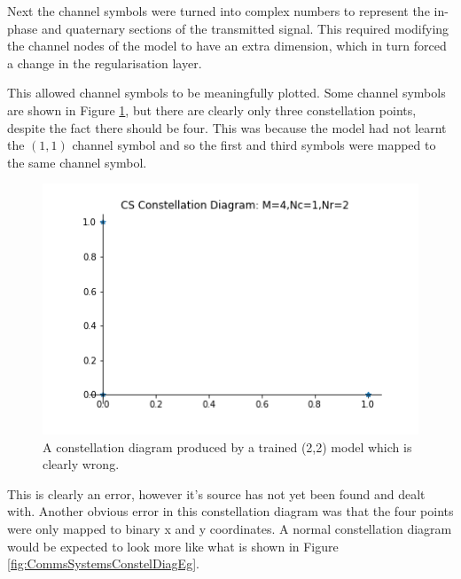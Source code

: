\documentclass[12pt,onecolumn,letterpaper]{article}
\begin{document}
Next the channel symbols were turned into complex numbers to represent the in-phase and quaternary sections of the transmitted signal. This required modifying the channel nodes of the model to have an extra dimension, which in turn forced a change in the regularisation layer.

This allowed channel symbols to be meaningfully plotted. Some channel symbols are shown in Figure \ref{fig:WrongConstellationDiagram}, but there are clearly only three constellation points, despite the fact there should be four. This was because the model had not learnt the $(1,1)$ channel symbol and so the first and third symbols were mapped to the same channel symbol.

\begin{figure}[t]
\begin{center}
   \includegraphics[width=0.8\linewidth]{figures/wrong_constellation_diagram.png}
\end{center}
   \caption{A constellation diagram produced by a trained (2,2) model which is clearly wrong. }
\label{fig:WrongConstellationDiagram}
\end{figure}

This is clearly an error, however it's source has not yet been found and dealt with. Another obvious error in this constellation diagram was that the four points were only mapped to binary x and y coordinates. A normal constellation diagram would be expected to look more like what is shown in Figure \ref{fig:CommsSystemsConstelDiagEg}.
\end{document}
